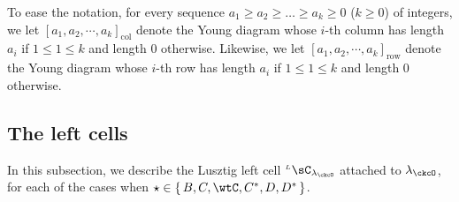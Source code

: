 \documentclass[12pt,a4paper]{amsart}
\numberwithin{equation}{section}
\theoremstyle{remark}
\def\LC{{}^{\scriptscriptstyle L}\sC}
\begin{document}
To ease the notation, for every sequence $a_1\geq a_2\geq \dots \geq a_k\geq 0$ ($k\geq 0$) of integers,   we let $[a_1, a_2, \cdots, a_k]_{\mathrm{col}}$ denote the Young diagram
whose $i$-th column has length $a_i$ if $1 \leq 1 \leq k$ and length $0$
otherwise. Likewise, we let $[a_1, a_2, \cdots, a_k]_{\mathrm{row}}$ denote the Young diagram
whose $i$-th  row has length $a_i$ if $1 \leq 1 \leq k$ and length $0$ otherwise.



  \subsection{The left cells}
  \label{sec:LCBCD}
  In this subsection, we describe the Lusztig left cell $\LC_{\lambda_{\ckcO}}$
  attached to $\lambda_{\ckcO}$, for each of the cases when $\star \in \set{B,C,\wtC,C^{*},D,D^{*}}$.
\end{document}
